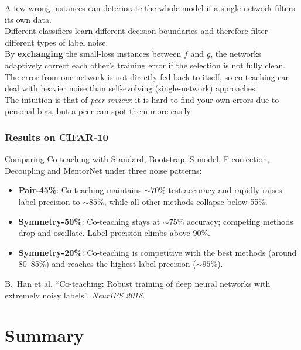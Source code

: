 \documentclass[11pt,a4paper]{article}
\theoremstyle{definition}
\theoremstyle{plain}
\theoremstyle{remark}
\begin{document}
\begin{tcolorbox}[colback=yellow!5!white,colframe=orange!80!black,title=\textbf{Q2: Why two networks and cross-update parameters?}]
A few wrong instances can deteriorate the whole model if a single network filters its own data.\\
Different classifiers learn different decision boundaries and therefore filter different types of label noise.\\
By \textbf{exchanging} the small-loss instances between $f$ and $g$, the networks adaptively correct each other's training error if the selection is not fully clean. The error from one network is not directly fed back to itself, so co-teaching can deal with heavier noise than self-evolving (single-network) approaches.\\
The intuition is that of \emph{peer review}: it is hard to find your own errors due to personal bias, but a peer can spot them more easily.
\end{tcolorbox}

\subsubsection{Results on CIFAR-10}

Comparing Co-teaching with Standard, Bootstrap, S-model, F-correction, Decoupling and MentorNet under three noise patterns:

\begin{itemize}
    \item \textbf{Pair-45\%}: Co-teaching maintains $\sim 70$\% test accuracy and rapidly raises label precision to $\sim 85\%$, while all other methods collapse below 55\%.
    \item \textbf{Symmetry-50\%}: Co-teaching stays at $\sim 75$\% accuracy; competing methods drop and oscillate. Label precision climbs above 90\%.
    \item \textbf{Symmetry-20\%}: Co-teaching is competitive with the best methods (around 80--85\%) and reaches the highest label precision ($\sim 95$\%).
\end{itemize}

\begin{tcolorbox}[colback=blue!5!white,colframe=blue!60!black,title={Reference}]
B.\ Han et al. ``Co-teaching: Robust training of deep neural networks with extremely noisy labels''. \textit{NeurIPS 2018}.
\end{tcolorbox}


\section{Summary}
\end{document}
